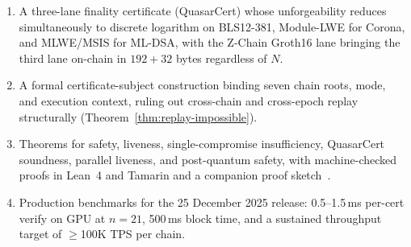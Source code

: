 \begin{enumerate}[leftmargin=2em]
\item A three-lane finality certificate (QuasarCert) whose unforgeability
      reduces simultaneously to discrete logarithm on BLS12-381,
      Module-LWE for Corona, and MLWE/MSIS for ML-DSA, with the
      Z-Chain Groth16 lane bringing the third lane on-chain in
      $192{+}32$ bytes regardless of $N$.
\item A formal certificate-subject construction binding seven chain
      roots, mode, and execution context, ruling out cross-chain and
      cross-epoch replay structurally
      (Theorem~\ref{thm:replay-impossible}).
\item Theorems for safety, liveness, single-compromise insufficiency,
      QuasarCert soundness, parallel liveness, and post-quantum safety,
      with machine-checked proofs in Lean~4 and Tamarin and a companion
      proof sketch~\cite{qcert-proof}.
\item Production benchmarks for the 25 December 2025 release: 0.5--1.5\,ms
      per-cert verify on GPU at $n{=}21$, 500\,ms block time, and
      a sustained throughput target of $\geq$100K TPS per chain.
\end{enumerate}


